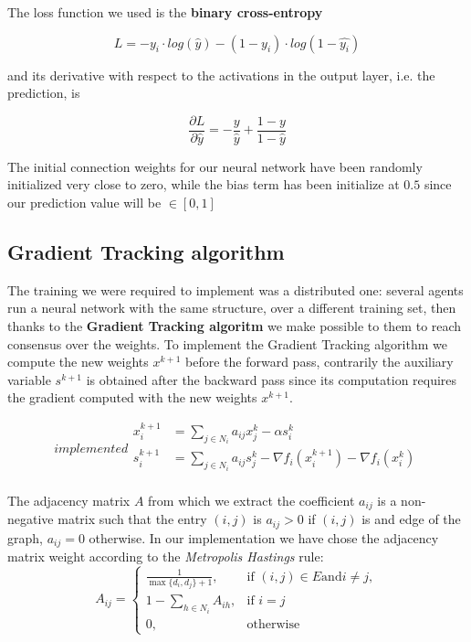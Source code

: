 \documentclass[a4paper,11pt,oneside]{book}
\begin{document}
The loss function we used is the \textbf{binary cross-entropy}

\begin{equation}
L = - y_i \cdot log(\hat{y}) - (1 - y_i) \cdot log(1 - \hat{y_i})
\end{equation}

and its derivative with respect to the activations in the output layer, i.e. the prediction, is

\begin{equation}
\frac{\partial L}{\partial \hat{y}} = - \frac{y}{\hat{y}} + \frac{1 - y}{1 - \hat{y}}
\end{equation}

\bigskip 
The initial connection weights for our neural network have been randomly initialized very close to zero, while the bias term has been initialize at $0.5$ since our prediction value will be $\in[0,1]$ 

\subsection{Gradient Tracking algorithm}
The training we were required to implement was a distributed one: several agents run a neural network with the same structure, over a different training set, then thanks to the \textbf{Gradient Tracking algoritm} we make possible to them to reach consensus over the weights.
To implement the Gradient Tracking algorithm we compute the new weights $x^{k+1}$ before the forward pass, contrarily the auxiliary variable $s^{k+1}$ is obtained after the backward pass since its computation requires the gradient computed with the new weights $x^{k+1}$.

\begin {equation}implemented
\begin{split}
x_i^{k+1} &= \sum_{j \in N_i} a_{ij} x_j^k - \alpha s_i^k \\
s_i^{k+1}   &= \sum_{j \in N_i} a_{ij} s_j^k - \nabla f_i(x_i^{k+1}) - \nabla f_i(x_i^k) \\
\end{split}
\end{equation}

The adjacency matrix $A$ from which we extract the coefficient $a_{ij}$ is a non-negative matrix such that the entry $(i,j)$ is $a_{ij}>0$ if $(i,j)$ is and edge of the graph, $a_{ij}=0$ otherwise.
In our implementation we have chose the adjacency matrix weight according to the \textit{Metropolis Hastings} rule:
\begin{equation}
A_{ij} = 
\begin{cases}
\frac{1}{\max\{d_i,d_j\}+1},  &\text{if } (i,j) \in E \text{and} i \neq j, \\
1-\sum_{h \in N_i} A_{ih}, &\text{if }  i=j \\
0, &\text{otherwise}
\end{cases}
\end{equation}
\end{document}

